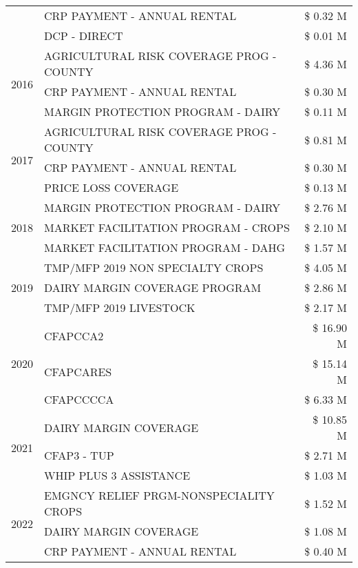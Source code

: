 \begin{tabular}{llr}
 & CRP PAYMENT - ANNUAL RENTAL & \$ 0.32 M \\
 & DCP - DIRECT & \$ 0.01 M \\
\cline{1-3}
\multirow[t]{3}{*}{2016} & AGRICULTURAL RISK COVERAGE PROG - COUNTY & \$ 4.36 M \\
 & CRP PAYMENT - ANNUAL RENTAL & \$ 0.30 M \\
 & MARGIN PROTECTION PROGRAM - DAIRY & \$ 0.11 M \\
\cline{1-3}
\multirow[t]{3}{*}{2017} & AGRICULTURAL RISK COVERAGE PROG - COUNTY & \$ 0.81 M \\
 & CRP PAYMENT - ANNUAL RENTAL & \$ 0.30 M \\
 & PRICE LOSS COVERAGE & \$ 0.13 M \\
\cline{1-3}
\multirow[t]{3}{*}{2018} & MARGIN PROTECTION PROGRAM - DAIRY & \$ 2.76 M \\
 & MARKET FACILITATION PROGRAM - CROPS & \$ 2.10 M \\
 & MARKET FACILITATION PROGRAM - DAHG & \$ 1.57 M \\
\cline{1-3}
\multirow[t]{3}{*}{2019} & TMP/MFP 2019 NON SPECIALTY CROPS & \$ 4.05 M \\
 & DAIRY MARGIN COVERAGE PROGRAM & \$ 2.86 M \\
 & TMP/MFP 2019 LIVESTOCK & \$ 2.17 M \\
\cline{1-3}
\multirow[t]{3}{*}{2020} & CFAPCCA2 & \$ 16.90 M \\
 & CFAPCARES & \$ 15.14 M \\
 & CFAPCCCCA & \$ 6.33 M \\
\cline{1-3}
\multirow[t]{3}{*}{2021} & DAIRY MARGIN COVERAGE & \$ 10.85 M \\
 & CFAP3 - TUP & \$ 2.71 M \\
 & WHIP PLUS 3 ASSISTANCE & \$ 1.03 M \\
\cline{1-3}
\multirow[t]{3}{*}{2022} & EMGNCY RELIEF PRGM-NONSPECIALITY CROPS & \$ 1.52 M \\
 & DAIRY MARGIN COVERAGE & \$ 1.08 M \\
 & CRP PAYMENT - ANNUAL RENTAL & \$ 0.40 M \\
\cline{1-3}
\bottomrule
\end{tabular}
